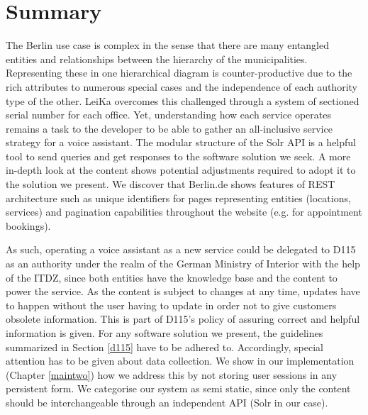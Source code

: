 


\section{Summary}
The Berlin use case is complex in the sense that there are many entangled entities and relationships between the hierarchy of the municipalities. Representing these in one hierarchical diagram is counter-productive due to the rich attributes to numerous special cases and the independence of each authority type of the other. LeiKa overcomes this challenged through a system of sectioned serial number for each office. Yet, understanding how each service operates remains a task to the developer to be able to gather an all-inclusive service strategy for a voice assistant. The modular structure of the Solr API is a helpful tool to send queries and get responses to the software solution we seek. A more in-depth look at the content shows potential adjustments required to adopt it to the solution we present.
We discover that Berlin.de shows features of REST architecture such as unique identifiers for pages representing entities (locations, services) and pagination capabilities throughout the website (e.g. for appointment bookings).

As such, operating a voice assistant as a new service could be delegated to D115 as an authority under the realm of the German Ministry of Interior with the help of the ITDZ, since both entities have the knowledge base and the content to power the service. As the content is subject to changes at any time, updates have to happen without the user having to update in order not to give customers obsolete information. This is part of D115's policy of assuring correct and helpful information is given. For any software solution we present, the guidelines summarized in Section \ref{d115} have to be adhered to. Accordingly, special attention has to be given about data collection. We show in our implementation (Chapter \ref{maintwo}) how we address this by not storing user sessions in any persistent form.
We categorise our system as semi static, since only the content should be interchangeable through an independent API (Solr in our case). 

